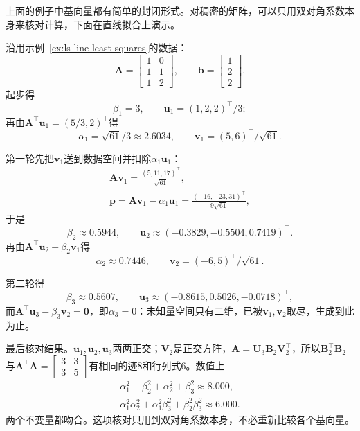 上面的例子中基向量都有简单的封闭形式。对稠密的矩阵，可以只用双对角系数本身来核对计算，下面在直线拟合上演示。

\begin{example}[直线拟合上的两步双对角化]
\label{ex:ls-golub-kahan-line}
沿用示例~\ref{ex:ls-line-least-squares}的数据：
\[
 \bm A=\begin{bmatrix}1&0\\1&1\\1&2\end{bmatrix},\qquad
 \bm b=\begin{bmatrix}1\\2\\2\end{bmatrix}.
\]
起步得
\[
 \beta_1=3,\qquad \bm u_1=(1,2,2)^\top/3 ;
\]
再由$\bm A^\top\bm u_1=(5/3,2)^\top$得
\[
 \alpha_1=\sqrt{61}/3\approx2.6034,\qquad \bm v_1=(5,6)^\top/\sqrt{61} .
\]

第一轮先把$\bm v_1$送到数据空间并扣除$\alpha_1\bm u_1$：
\[
 \begin{gathered}
 \bm A\bm v_1=\frac{(5,11,17)^\top}{\sqrt{61}},\\
 \bm p=\bm A\bm v_1-\alpha_1\bm u_1=\frac{(-16,-23,31)^\top}{9\sqrt{61}},
 \end{gathered}
\]
于是
\[
  \beta_2\approx0.5944, \qquad \bm u_2\approx(-0.3829,-0.5504,0.7419)^\top .
\]
再由$\bm A^\top\bm u_2-\beta_2\bm v_1$得
\[
  \alpha_2\approx0.7446, \qquad \bm v_2=(-6,5)^\top/\sqrt{61} .
\]

第二轮得
\[
  \beta_3\approx0.5607, \qquad \bm u_3\approx(-0.8615,0.5026,-0.0718)^\top ,
\]
而$\bm A^\top\bm u_3-\beta_3\bm v_2=\bm0$，即$\alpha_3=0$：未知量空间只有二维，已被$\bm v_1,\bm v_2$取尽，生成到此为止。

最后核对结果。$\bm u_1,\bm u_2,\bm u_3$两两正交；$\bm V_2$是正交方阵，$\bm A=\bm U_3\bm B_2\bm V_2^\top$，所以$\bm B_2^\top\bm B_2$与$\bm A^\top\bm A=\left[\begin{smallmatrix}3&3\\3&5\end{smallmatrix}\right]$有相同的迹$8$和行列式$6$。数值上
\[
 \begin{gathered}
 \alpha_1^2+\beta_2^2+\alpha_2^2+\beta_3^2\approx8.000,\\
 \alpha_1^2\alpha_2^2+\alpha_1^2\beta_3^2+\beta_2^2\beta_3^2\approx6.000 .
 \end{gathered}
\]
两个不变量都吻合。这项核对只用到双对角系数本身，不必重新比较各个基向量。
\end{example}

